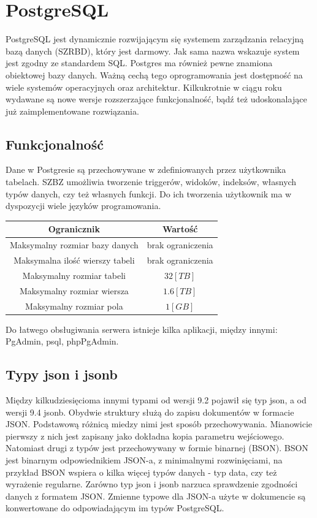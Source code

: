 \documentclass[a4paper,12pt,table]{article}
\begin{document}
{\section{PostgreSQL}
PostgreSQL jest dynamicznie rozwijającym się systemem zarządzania relacyjną bazą danych (SZRBD), który jest darmowy. Jak sama nazwa wskazuje system jest zgodny ze standardem SQL. Postgres ma również pewne znamiona obiektowej bazy danych. Ważną cechą tego oprogramowania jest dostępność na wiele systemów operacyjnych oraz architektur. Kilkukrotnie w ciągu roku wydawane są nowe wersje rozszerzające funkcjonalność, bądź też udoskonalające już zaimplementowane rozwiązania.  
\subsection{Funkcjonalność}
Dane w Postgresie są przechowywane w zdefiniowanych przez użytkownika tabelach. SZBZ umożliwia tworzenie triggerów, widoków, indeksów, własnych typów danych, czy też własnych funkcji. Do ich tworzenia użytkownik ma w dyspozycji wiele języków programowania.
\begin{center}

  \begin{tabular}{ | c | c | }
    \hline
    \textbf{Ogranicznik} & \textbf{Wartość} \\ \hline
    Maksymalny rozmiar bazy danych & brak ograniczenia \\ \hline
    Maksymalna ilość wierszy tabeli & brak ograniczenia  \\ \hline
    Maksymalny rozmiar tabeli & $32\left[TB\right]$\\ \hline
    Maksymalny rozmiar wiersza & $1.6\left[TB\right]$\\ \hline
    Maksymalny rozmiar pola & $1\left[GB\right]$ \\
    \hline
    
  \end{tabular}
\end{center}


 Do łatwego obsługiwania serwera istnieje kilka aplikacji, między innymi: PgAdmin, psql, phpPgAdmin.
\subsection{Typy json i jsonb}
Między kilkudziesięcioma innymi typami od wersji 9.2 pojawił się typ json, a od wersji 9.4 jsonb. Obydwie struktury służą do zapisu dokumentów w formacie JSON. Podstawową różnicą miedzy nimi jest sposób przechowywania. Mianowicie pierwszy z nich jest zapisany jako dokładna kopia parametru wejściowego. Natomiast drugi z typów jest przechowywany w formie binarnej (BSON). BSON jest binarnym odpowiednikiem JSON-a, z minimalnymi rozwinięciami, na przykład BSON wspiera o kilka więcej typów danych - typ data, czy też wyrażenie regularne. Zarówno typ json i jsonb narzuca sprawdzenie zgodności danych z formatem JSON. Zmienne typowe dla JSON-a użyte w dokumencie są konwertowane do odpowiadającym im typów PostgreSQL.\cite{p}\setlength{\parskip}{1.5\bigskipamount plus \smallskipamount minus \smallskipamount}
\begin{center}


\end{center}}
\end{document}
